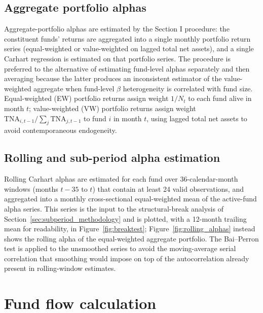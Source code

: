 \documentclass[12pt, oneside]{report}
\begin{document}
\subsection{Aggregate portfolio alphas}
\label{sec:agg_alphas}

\noindent Aggregate-portfolio alphas are estimated by the
\textcite{FamaFrench2010} Section I procedure: the constituent funds'
returns are aggregated into a single monthly portfolio return series
(equal-weighted or value-weighted on lagged total net assets), and a
single Carhart regression is estimated on that portfolio series. The
procedure is preferred to the alternative of estimating fund-level
alphas separately and then averaging because the latter produces an
inconsistent estimator of the value-weighted aggregate when fund-level
$\beta$ heterogeneity is correlated with fund size. Equal-weighted (EW)
portfolio returns assign weight $1/N_t$ to each fund alive in month $t$;
value-weighted (VW) portfolio returns assign weight
$\text{TNA}_{i,t-1} / \sum_j \text{TNA}_{j,t-1}$ to fund $i$ in
month $t$, using lagged total net assets to avoid contemporaneous
endogeneity.

\subsection{Rolling and sub-period alpha estimation}
\label{sec:rolling_alphas}

\noindent Rolling Carhart alphas are estimated for each fund over
36-calendar-month windows (months $t-35$ to $t$) that contain at least 24
valid observations, and aggregated into a
monthly cross-sectional equal-weighted mean of the active-fund alpha
series. This series is the input to the structural-break analysis of
Section~\ref{sec:subperiod_methodology} and is plotted, with a 12-month
trailing mean for readability, in Figure~\ref{fig:breaktest};
Figure~\ref{fig:rolling_alphas} instead shows the rolling alpha of the
equal-weighted aggregate portfolio. The Bai--Perron test is applied to
the unsmoothed series to avoid the
moving-average serial correlation that smoothing would impose on top of
the autocorrelation already present in rolling-window estimates.

\section{Fund flow calculation}
\label{sec:flow_calculation}
\end{document}
